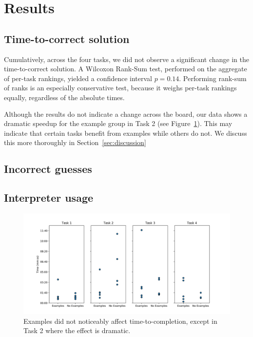 \section{Results}
\subsection{Time-to-correct solution}
Cumulatively, across the four tasks, we did not observe a significant change
in the time-to-correct solution.
%
A Wilcoxon Rank-Sum test, performed on the aggregate of per-task rankings,
yielded a confidence interval $p=0.14$.
%
Performing rank-sum of ranks is an especially conservative test, because it weighs
per-task rankings equally, regardless of the absolute times.

Although the results do not indicate a change across the board, our data shows a dramatic
speedup for the example group in Task 2 (see Figure~\ref{fig:data-points}).
%
This may indicate that certain tasks benefit from examples while others do not.
%
We discuss this more thoroughly in Section~\ref{sec:discussion}

\subsection{Incorrect guesses}
\subsection{Interpreter usage}
\begin{figure}[ht]
  \centering
  \includegraphics[width=\textwidth]{results/task_points.png}
  \caption{
    Examples did not noticeably affect time-to-completion, except in Task 2
    where the effect is dramatic.
  }
  \label{fig:data-points}
\end{figure}